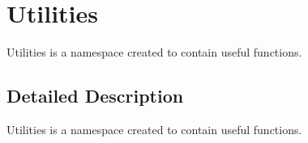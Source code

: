 \hypertarget{group___utilities}{}\section{Utilities}
\label{group___utilities}


Utilities is a namespace created to contain useful functions.  




\subsection{Detailed Description}
Utilities is a namespace created to contain useful functions. 


